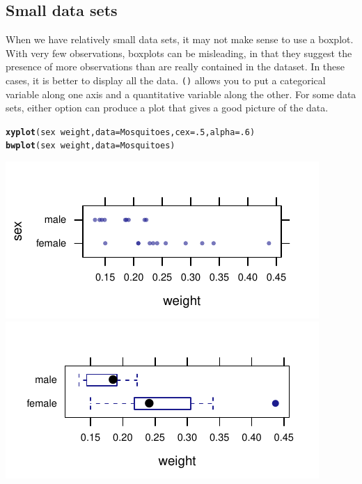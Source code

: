 \documentclass[twoside]{book}\usepackage[]{graphicx}\usepackage[]{xcolor}
\makeatletter
\def\maxwidth{ %
  \ifdim\Gin@nat@width>\linewidth
    \linewidth
  \else
    \Gin@nat@width
  \fi
}
\newcommand{\hlnum}[1]{\textcolor[rgb]{0.686,0.059,0.569}{#1}}%
\newcommand{\hlopt}[1]{\textcolor[rgb]{0,0,0}{#1}}%
\newcommand{\hlstd}[1]{\textcolor[rgb]{0.345,0.345,0.345}{#1}}%
\newcommand{\hlkwc}[1]{\textcolor[rgb]{0.333,0.667,0.333}{#1}}%
\newcommand{\hlkwd}[1]{\textcolor[rgb]{0.737,0.353,0.396}{\textbf{#1}}}%
\newenvironment{kframe}{%
 \def\at@end@of@kframe{}%
 \ifinner\ifhmode%
  \def\at@end@of@kframe{\end{minipage}}%
  \begin{minipage}{\columnwidth}%
 \fi\fi%
 \def\FrameCommand##1{\hskip\@totalleftmargin \hskip-\fboxsep
 \colorbox{shadecolor}{##1}\hskip-\fboxsep
     \hskip-\linewidth \hskip-\@totalleftmargin \hskip\columnwidth}%
 \MakeFramed {\advance\hsize-\width
   \@totalleftmargin\z@ \linewidth\hsize
   \@setminipage}}%
 {\par\unskip\endMakeFramed%
 \at@end@of@kframe}
\newenvironment{knitrout}{}{} %
\newcommand{\Rindex}[1]{\index{\texttt{#1}}}
\newcommand{\function}[1]{{\color{purple!75!blue}\texttt{\StrSubstitute{#1}{()}{}()}}\Rindex{#1}}
\makeatother
\begin{document}
\subsection{Small data sets}
When we have relatively small data sets, it may not make sense to use a boxplot.  With very few observations, boxplots can be misleading, in that they suggest the presence of more observations than are really contained in the dataset.  
In these cases, it is better to 
display all the data.  \function{xyplot()} allows you to put a categorical variable along one axis and a 
quantitative variable along the other.  
For some data sets, either option can produce a plot that gives a good picture
of the data.
\begin{knitrout}
\color{fgcolor}\begin{kframe}
\begin{alltt}
\hlkwd{xyplot}\hlstd{( sex} \hlopt{~} \hlstd{weight,} \hlkwc{data}\hlstd{=Mosquitoes,} \hlkwc{cex}\hlstd{=}\hlnum{.5}\hlstd{,} \hlkwc{alpha}\hlstd{=}\hlnum{.6}\hlstd{)}
\hlkwd{bwplot}\hlstd{( sex} \hlopt{~} \hlstd{weight,} \hlkwc{data}\hlstd{=Mosquitoes)}
\end{alltt}
\end{kframe}

{\centering \includegraphics[width=\maxwidth]{figures/fig-xyplot-quant-by-cat-1} 
\includegraphics[width=\maxwidth]{figures/fig-xyplot-quant-by-cat-2} 

}



\end{knitrout}
\end{document}
